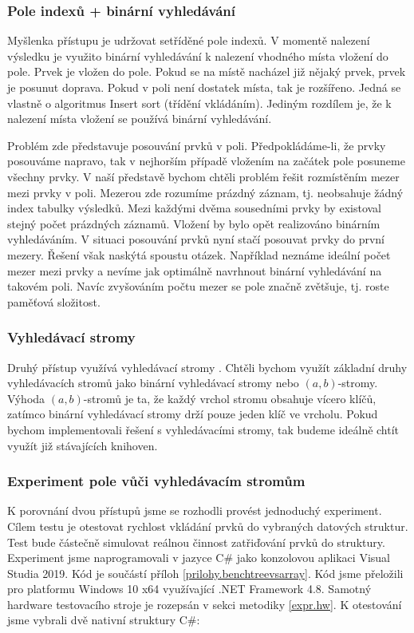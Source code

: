 \subsubsection{Pole indexů + binární vyhledávání}

Myšlenka přístupu je udržovat setříděné pole indexů. 
V momentě nalezení výsledku je využito binární vyhledávání \citep[str. 26]{labyrint} k nalezení vhodného místa vložení do pole.
Prvek je vložen do pole.
Pokud se na místě nacházel již nějaký prvek, prvek je posunut doprava.
Pokud v poli není dostatek místa, tak je rozšířeno.
Jedná se vlastně o algoritmus Insert sort (třídění vkládáním).
Jediným rozdílem je, že k nalezení místa vložení se používá binární vyhledávání.

Problém zde představuje posouvání prvků v poli.
Předpokládáme-li, že prvky posouváme napravo, tak v nejhorším případě vložením na začátek pole posuneme všechny prvky.
V naší představě bychom chtěli problém řešit rozmístěním mezer mezi prvky v poli.
Mezerou zde rozumíme prázdný záznam, tj. neobsahuje žádný index tabulky výsledků.
Mezi každými dvěma sousedními prvky by existoval stejný počet prázdných záznamů.
Vložení by bylo opět realizováno binárním vyhledáváním.
V situaci posouvání prvků nyní stačí posouvat prvky do první mezery.
Řešení však naskýtá spoustu otázek.
Například neznáme ideální počet mezer mezi prvky a nevíme jak optimálně navrhnout binární vyhledávání na takovém poli.
Navíc zvyšováním počtu mezer se pole značně zvětšuje, tj. roste paměťová složitost.

\subsubsection{Vyhledávací stromy}

Druhý přístup využívá vyhledávací stromy \citep[str. 177]{labyrint}.
Chtěli bychom využít základní druhy vyhledávacích stromů jako binární vyhledávací stromy nebo $(a, b)$-stromy.
Výhoda $(a, b)$-stromů je ta, že každý vrchol stromu obsahuje vícero klíčů, zatímco binární vyhledávací stromy drží pouze jeden klíč ve vrcholu.
Pokud bychom implementovali řešení s vyhledávacími stromy, tak budeme ideálně chtít využít již stávajících knihoven.

\subsubsection{Experiment pole vůči vyhledávacím stromům}

K porovnání dvou přístupů jsme se rozhodli provést jednoduchý experiment.
Cílem testu je otestovat rychlost vkládání prvků do vybraných datových struktur.
Test bude částečně simulovat reálnou činnost zatřiďování prvků do struktury.
Experiment jsme naprogramovali v jazyce C\# jako konzolovou aplikaci Visual Studia 2019.
Kód je součástí příloh \ref{prilohy.benchtreevsarray}.
Kód jsme přeložili pro platformu Windows 10 x64 využívající .NET Framework 4.8.
Samotný hardware testovacího stroje je rozepsán v sekci metodiky \ref{expr.hw}.
K otestování jsme vybrali dvě nativní struktury C\#:

